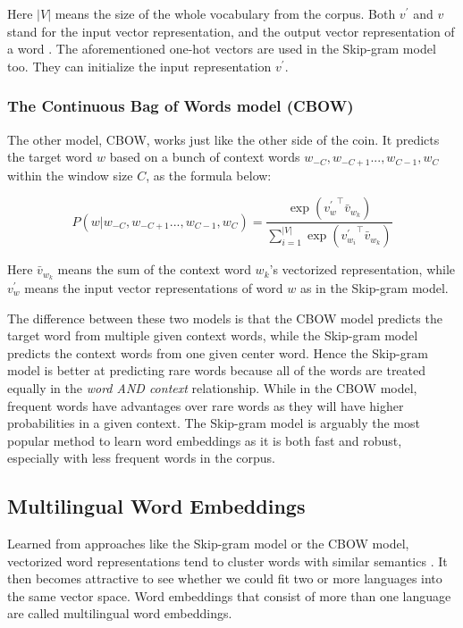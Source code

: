 \documentclass[thesis,fonts=libertine]{cluu}
\begin{document}
Here $|V|$ means the size of the whole vocabulary from the corpus. Both $v^\prime$ and $v$ stand for the input vector representation, and the output vector representation of a word \parencite{Mikolov:2013aa}. The aforementioned one-hot vectors are used in the Skip-gram model too. They can initialize the input representation $v^\prime$.

\subsubsection{The Continuous Bag of Words model (CBOW)}

The other model, CBOW, works just like the other side of the coin. It predicts the target word $w$ based on a bunch of context words $w_{-C}, w_{-C+1} ..., w_{C-1}, w_C$ within the window size $C$, as the formula below:

\begin{equation}
  P(w|w_{-C}, w_{-C+1} ..., w_{C-1}, w_C)=\frac{\exp({v^\prime_w}^\intercal \bar{v}_{w_k})}{\sum^{|V|}_{i=1}\exp({v^\prime_{w_i}}^\intercal \bar{v}_{w_k})}
\end{equation}

Here $\bar{v}_{w_k}$ means the sum of the context word $w_k$'s vectorized representation, while $v^\prime_w$ means the input vector representations of word $w$ as in the Skip-gram model.

The difference between these two models is that the CBOW model predicts the target word from multiple given context words, while the Skip-gram model predicts the context words from one given center word. Hence the Skip-gram model is better at predicting rare words because all of the words are treated equally in the \textit{word AND context} relationship. While in the CBOW model, frequent words have advantages over rare words as they will have higher probabilities in a given context. The Skip-gram model is arguably the most popular method to learn word embeddings as it is both fast and robust, especially with less frequent words in the corpus. \parencite{levy-etal-2015-improving}

\subsection{Multilingual Word Embeddings}

Learned from approaches like the Skip-gram model or the CBOW model, vectorized word representations tend to cluster words with similar semantics \parencite{Mikolov:2013ac}. It then becomes attractive to see whether we could fit two or more languages into the same vector space. Word embeddings that consist of more than one language are called multilingual word embeddings.
\end{document}
